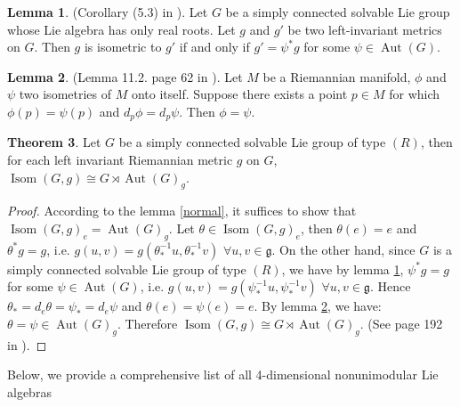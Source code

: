 \documentclass[12pt,a4paper,twoside]{article}
\theoremstyle{definition}
\newtheorem{theorem}{Theorem}[section]
\newtheorem{lemma}[theorem]{Lemma}
\begin{document}
\begin{lemma} \label{gordon} (Corollary (5.3) in \cite{gordon1988isometry}).
Let $G$ be a simply connected solvable Lie group whose Lie algebra has only real roots. Let $g$ and $g'$ be two left-invariant metrics on $G$. Then $g$ is isometric to $g'$ if and only if $g' = \psi^{\ast} g$ for some $\psi \in \operatorname{Aut}(G)$.
\end{lemma}
\begin{lemma} \label{helgason} (Lemma 11.2. page 62 in \cite{helgason}).
Let $M$ be a Riemannian manifold, $\phi$ and $\psi$ two isometries of $M$ onto itself. Suppose there exists a point $p \in M$ for which $\phi(p) = \psi(p)$ and $d_p\phi = d_p\psi$. Then $\phi = \psi$.
\end{lemma}
\begin{theorem}
Let $G$ be a simply connected solvable Lie group of type $(R)$, then for each left invariant Riemannian metric $g$ on $G$, $\operatorname{Isom}(G, g) \cong G \rtimes \operatorname{Aut}(G)_g$.
\end{theorem}
\begin{proof}
According to the lemma \ref{normal}, it suffices to show that $\operatorname{Isom}(G, g)_e = \operatorname{Aut}(G)_g$. Let $\theta \in \operatorname{Isom}(G, g)_e$, then $\theta(e) = e$ and $\theta^{\ast}g = g$, i.e. $g(u, v) = g(\theta_{\ast}^{-1}u, \theta_{\ast}^{-1}v) \,\, \forall u, v\in \mathfrak{g}$. On the other hand, since $G$ is a simply connected solvable Lie group of type $(R)$, we have by lemma \ref{gordon}, $\psi^{\ast}g = g$ for some $\psi \in \operatorname{Aut}(G)$, i.e. $g(u, v) = g(\psi_{\ast}^{-1}u, \psi_{\ast}^{-1}v) \,\, \forall u, v\in \mathfrak{g}$.
Hence $\theta_{\ast} = d_e\theta = \psi_{\ast} = d_e\psi$ and $\theta(e) = \psi(e) = e$. By lemma \ref{helgason}, we have:\\ $\theta = \psi \in \operatorname{Aut}(G)_g$. Therefore $\operatorname{Isom}(G, g) \cong G \rtimes \operatorname{Aut}(G)_g$. (See page 192 in \cite{ha2012isometry}).
\end{proof}
Below, we provide a comprehensive list of all 4-dimensional nonunimodular Lie algebras \cite{kremlev2010signature}
\end{document}
